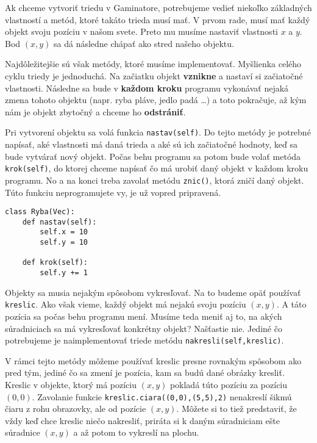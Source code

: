 
Ak chceme vytvoriť triedu v Gaminatore, potrebujeme vedieť niekoľko základných vlastností a metód,
ktoré takáto trieda musí mať. V prvom rade, musí mať každý objekt svoju pozíciu v našom svete. Preto
mu musíme nastaviť vlastnosti $x$ a $y$. Bod $(x,y)$ sa dá následne chápať ako stred našeho objektu.

Najdôležitejšie sú však metódy, ktoré musíme implementovať. Myšlienka celého cyklu triedy je
jednoduchá. Na začiatku objekt \textbf{vznikne} a nastaví si začiatočné vlastnosti. Následne sa bude
v \textbf{každom kroku} programu vykonávať nejaká zmena tohoto objektu (napr. ryba pláve, jedlo padá
\dots) a toto pokračuje, až kým nám je objekt zbytočný a chceme ho \textbf{odstrániť}.

Pri vytvorení objektu sa volá funkcia \texttt{nastav(self)}. Do tejto metódy je potrebné napísať, aké
vlastnosti má daná trieda a aké sú ich začiatočné hodnoty, keď sa bude vytvárať nový objekt. Počas
behu programu sa potom bude volať metóda \texttt{krok(self)}, do ktorej chceme napísať čo má urobiť daný
objekt v každom kroku programu. No a na konci treba zavolať metódu \texttt{znic()}, ktorá zničí daný
objekt. Túto funkciu neprogramujete vy, je už vopred pripravená.

\begin{lstlisting}
class Ryba(Vec):
    def nastav(self):
        self.x = 10
        self.y = 10
    
    def krok(self):
        self.y += 1
\end{lstlisting}


Objekty sa musia nejakým spôsobom vykresľovať. Na to budeme opäť používať \texttt{kreslic}. Ako však
vieme, každý objekt má nejakú svoju pozíciu $(x,y)$. A táto pozícia sa počas behu programu mení.
Musíme teda meniť aj to, na akých súradniciach sa má vykresľovať konkrétny objekt? Našťastie nie.
Jediné čo potrebujeme je naimplementovať triede metódu \texttt{nakresli(self,kreslic)}.

V rámci tejto metódy môžeme používať kreslic presne rovnakým spôsobom ako pred tým, jediné čo sa
zmení je pozícia, kam sa budú dané obrázky kresliť. Kreslic v objekte, ktorý má pozíciu $(x,y)$
pokladá túto pozíciu za pozíciu $(0,0)$. Zavolanie funkcie \texttt{kreslic.ciara((0,0),(5,5),2)}
nenakreslí šikmú čiaru z rohu obrazovky, ale od pozície $(x,y)$. Môžete si to tiež predstaviť, že
vždy keď chce kreslic niečo nakresliť, priráta si k daným súradniciam ešte súradnice $(x,y)$ a až
potom to vykreslí na plochu.

